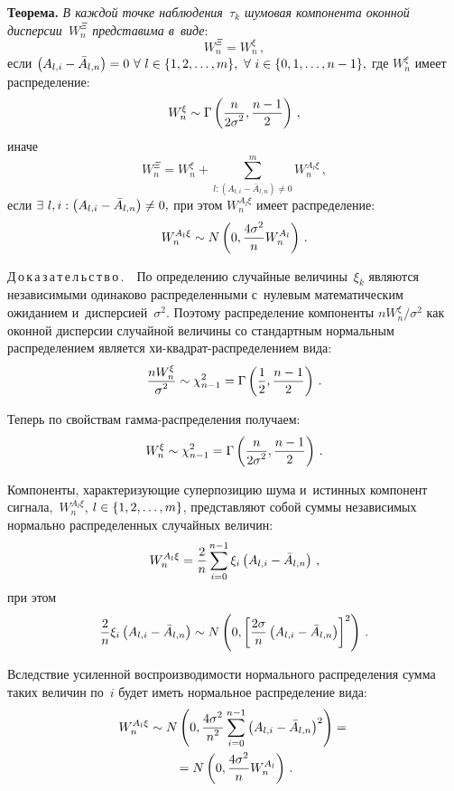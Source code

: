 \begin{multicols}{2}
\noindent
\textbf{Теорема.}
\textit{В каждой точке наблюдения~$\tau_{k}$ шумовая компонента оконной 
дисперсии~$W_n^{\Xi}$ представима в~\mbox{виде}}:
\begin{equation*}
W_{n}^{\Xi} = W_n^{\xi}\,,\end{equation*}
 если 
 $
\left( A_{l,i} - \bar{A}_{l,n}\right) = 0 \ \forall\
   l  \hm\in \{ 1, 2, \ldots, m\},\ \forall \ i \hm\in \{ 0, 1, \ldots, n-1\},
$
где $W_n^{\xi}$ имеет распределение:
$$
W_n^{\xi} \sim \Gamma\left( \displaystyle\frac{\displaystyle n\mathstrut}{\displaystyle 2\sigma^{2}\mathstrut}, \frac{n-1}{2}\right)\,,
$$
иначе
$$
W_{n}^{\Xi} = W_n^{\xi}  + \sum\limits_{l: \left( A_{l,i} - \bar{A}_{l,n}\right) 
\neq 0}^{m}W_n^{A_l\xi}\,,
$$
если $\exists \ 
l, i : \left( A_{l,i} - \bar{A}_{l,n}\right)\hm \neq 0,$
при этом $W_n^{A_l\xi}$ имеет распределение:
$$
W_n^{A_l\xi} \sim N \left( 0, \displaystyle\frac{\displaystyle 4\sigma^{2}\mathstrut}{\displaystyle n\mathstrut}W_n^{A_l}\right)\,.
$$

\noindent
Д\,о\,к\,а\,з\,а\,т\,е\,л\,ь\,с\,т\,в\,о\,.\ \
По определению случайные величины~$\xi_{k} $ являются независимыми одинаково 
распределенными с~нулевым математическим ожиданием и~дисперсией~$\sigma^{2}$. 
Поэтому распределение компоненты  ${nW_n^{\xi}}/{\sigma^{2}}$ 
как оконной дисперсии случайной величины со стандартным нормальным распределением
 является хи-квад\-рат-рас\-пре\-де\-ле\-ни\-ем вида:
$$
\displaystyle\frac{\displaystyle nW_n^{\xi}\mathstrut}{\displaystyle \sigma^{2}\mathstrut} \sim \chi^{2}_{n-1} = 
\Gamma\left( \displaystyle\frac{\displaystyle 1\mathstrut}{\displaystyle 2\mathstrut}, \displaystyle\frac{\displaystyle n-1\mathstrut}{\displaystyle 2\mathstrut}\right)\,. 
$$

Теперь по свойствам гам\-ма-рас\-пре\-де\-ле\-ния получаем:
$$
W_{n}^{\xi} \sim \chi^{2}_{n-1} = \Gamma\left( \displaystyle\frac{\displaystyle n\mathstrut}{\displaystyle 2\sigma^{2}\mathstrut}, 
\displaystyle\frac{\displaystyle n-1\mathstrut}{\displaystyle 2\mathstrut}\right)\,.
$$

Компоненты, характеризующие суперпозицию шума и~истинных компонент 
сигнала,~$W_{n}^{A_l\xi}$, $l \hm\in \{ 1, 2, \ldots, m\}$, представляют 
собой суммы независимых нормально распределенных случайных величин:
$$
W_n^{A_l\xi} = \displaystyle\frac{\displaystyle 2\mathstrut}{\displaystyle n\mathstrut}\sum\limits_{i=0}^{n-1}\xi_{i}\left( A_{l,i} - 
\bar{A}_{l,n}\right)\,,
$$
при этом
$$
\displaystyle\frac{\displaystyle 2\mathstrut}{\displaystyle n\mathstrut}\xi_{i}\left( A_{l,i} - \bar{A}_{l,n}\right)  
\sim N \left( 0, \left[\displaystyle\frac{\displaystyle 2\sigma\mathstrut}{\displaystyle n\mathstrut}\left( A_{l,i} - \bar{A}_{l,n}\right) \right]^{2} \right)\,.
$$

Вследствие усиленной воспроизводимости нормального распределения сумма таких 
величин по~$i$ будет иметь нормальное распределение вида:
\begin{multline*}
W_n^{A_l\xi} \sim N \left( 0, \displaystyle\frac{\displaystyle 4\sigma^{2}\mathstrut}{\displaystyle n^{2}\mathstrut}\sum\limits_{i=0}^{n-1}
\left( A_{l,i} - \bar{A}_{l,n}\right)^{2} \right) = {}\\
{}=
N \left( 0, \displaystyle\frac{\displaystyle 4\sigma^{2}\mathstrut}{\displaystyle n\mathstrut}W_n^{A_l}\right)\,.
\end{multline*}


\end{multicols}
